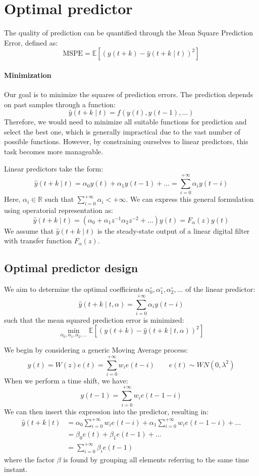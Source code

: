 \section{Optimal predictor}

The quality of prediction can be quantified through the Mean Square Prediction Error, defined as:
\[\text{MSPE}=\mathbb{E}\left[ {\left(y(t+k)-\hat{y}(t+k\mid t) \right)}^2 \right]\]

\paragraph*{Minimization}
Our goal is to minimize the squares of prediction errors. 
The prediction depends on past samples through a function:
\[\hat{y}(t+k\mid t)=f(y(t),y(t-1),\dots)\]
Therefore, we would need to minimize all suitable functions for prediction and select the best one, which is generally impractical due to the vast number of possible functions. 
However, by constraining ourselves to linear predictors, this task becomes more manageable.

Linear predictors take the form:
\[\hat{y}(t+k\mid t)=\alpha_0y(t)+\alpha_1y(t-1)+\dots=\sum_{i=0}^{+\infty}\alpha_i y(t-i)\]
Here, $\alpha_i \in \mathbb{R}$ such that $\sum_{i=0}^{+\infty}\alpha_i<+\infty$. 
We can express this general formulation using operatorial representation as:
\[\hat{y}(t+k\mid t)=\left(\alpha_0+\alpha_1z^{-1}\alpha_2z^{-2}+\dots\right)y(t)=F_{\alpha}(z)y(t)\]
We assume that $\hat{y}(t+k\mid t)$ is the steady-state output of a linear digital filter with transfer function $F_{\alpha}(z)$.

\subsection{Optimal predictor design}
We aim to determine the optimal coefficients $\alpha_0^{\circ},\alpha_1^{\circ},\alpha_2^{\circ},\dots$ of the linear predictor:
\[\hat{y}(t+k\mid t,\alpha)=\sum_{i=0}^{+\infty}\alpha_i y(t-i)\]
such that the mean squared prediction error is minimized:
\[\min_{\alpha_0,\alpha_1,\alpha_2,\dots}\mathbb{E}\left[{\left( y(t+k)-\hat{y}(t+k\mid t,\alpha) \right)}^2\right] \]

We begin by considering a generic Moving Average process:
\[y(t)=W(z)e(t) =\sum_{i=0}^{+\infty}w_i e(t-i) \qquad e(t)\sim WN(0,\lambda^2)\]
When we perform a time shift, we have:
\[y(t-1)=\sum_{i=0}^{+\infty}w_i e(t-1-i)\]
We can then insert this expression into the predictor, resulting in:
\begin{align*}
    \hat{y}(t+k\mid t)  &=\alpha_0\sum_{i=0}^{+\infty}w_i e(t-i)+\alpha_1\sum_{i=0}^{+\infty}w_i e(t-1-i)+\dots \\
                    &=\beta_0e(t)+\beta_1e(t-1)+\dots \\
                    &=\sum_{i=0}^{+\infty}\beta_i e(t-1)
\end{align*}
where the factor $\beta$ is found by grouping all elements referring to the same time instant.

